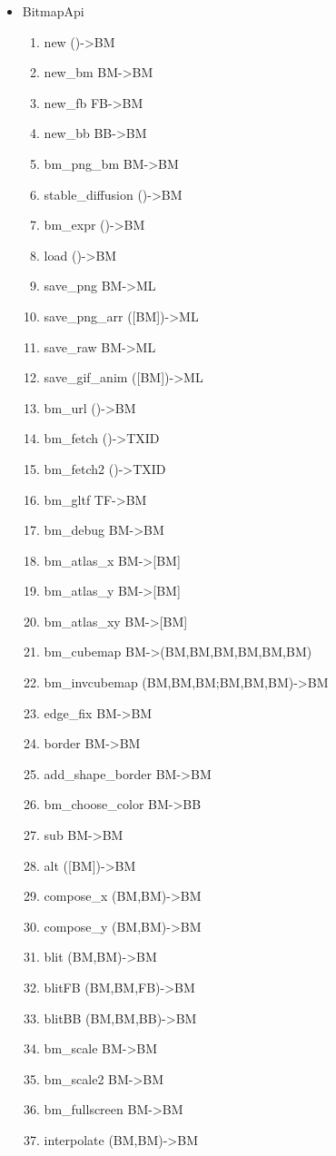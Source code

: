 \documentclass[11pt,twoside,a4paper]{article}
\begin{document}
\begin{itemize}
  \item BitmapApi
\begin{enumerate}
\item new ()->BM
\item new\_bm BM->BM
\item new\_fb FB->BM
\item new\_bb BB->BM
\item bm\_png\_bm BM->BM
\item stable\_diffusion ()->BM
\item bm\_expr ()->BM
\item load ()->BM
\item save\_png BM->ML
\item save\_png\_arr ([BM])->ML
\item save\_raw BM->ML 
\item save\_gif\_anim ([BM])->ML
\item bm\_url ()->BM
\item bm\_fetch ()->TXID
\item bm\_fetch2 ()->TXID
\item bm\_gltf TF->BM
\item bm\_debug BM->BM
\item bm\_atlas\_x BM->[BM]
\item bm\_atlas\_y BM->[BM]
\item bm\_atlas\_xy BM->[BM]
\item bm\_cubemap BM->(BM,BM,BM,BM,BM,BM)
\item bm\_invcubemap (BM,BM,BM;BM,BM,BM)->BM
\item edge\_fix BM->BM
\item border BM->BM 
\item add\_shape\_border BM->BM
\item bm\_choose\_color BM->BB
\item sub BM->BM
\item alt ([BM])->BM
\item compose\_x (BM,BM)->BM
\item compose\_y (BM,BM)->BM
\item blit (BM,BM)->BM
\item blitFB (BM,BM,FB)->BM
\item blitBB (BM,BM,BB)->BM
\item bm\_scale BM->BM
\item bm\_scale2 BM->BM
\item bm\_fullscreen BM->BM
\item interpolate (BM,BM)->BM

\end{enumerate}
\end{itemize}
\end{document}
